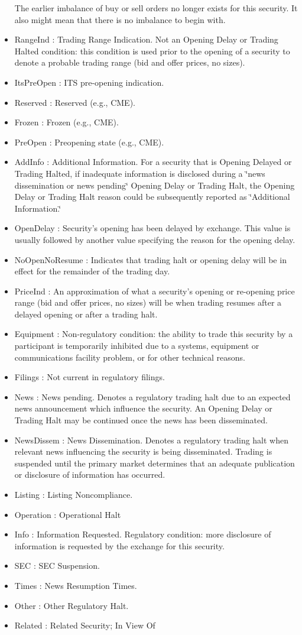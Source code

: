 \begin{itemize}
The earlier imbalance of buy or sell orders no longer exists for this security. It also might mean that there is no imbalance to begin with. \item Range\-Ind : Trading Range Indication. Not an Opening Delay or Trading Halted condition: this condition is used prior to the opening of a security to denote a probable trading range (bid and offer prices, no sizes). \item Its\-Pre\-Open : ITS pre-opening indication. \item Reserved : Reserved (e.g., CME). \item Frozen : Frozen (e.g., CME). \item Pre\-Open : Preopening state (e.g., CME). \item Add\-Info : Additional Information. For a security that is Opening Delayed or Trading Halted, if inadequate information is disclosed during a \char`\"{}news dissemination or news pending\char`\"{} Opening Delay or Trading Halt, the Opening Delay or Trading Halt reason could be subsequently reported as \char`\"{}Additional Information.\char`\"{} \item Open\-Delay : Security's opening has been delayed by exchange. This value is usually followed by another value specifying the reason for the opening delay. \item No\-Open\-No\-Resume : Indicates that trading halt or opening delay will be in effect for the remainder of the trading day. \item Price\-Ind : An approximation of what a security's opening or re-opening price range (bid and offer prices, no sizes) will be when trading resumes after a delayed opening or after a trading halt. \item Equipment : Non-regulatory condition: the ability to trade this security by a participant is temporarily inhibited due to a systems, equipment or communications facility problem, or for other technical reasons. \item Filings : Not current in regulatory filings. \item News : News pending. Denotes a regulatory trading halt due to an expected news announcement which influence the security. An Opening Delay or Trading Halt may be continued once the news has been disseminated. \item News\-Dissem : News Dissemination. Denotes a regulatory trading halt when relevant news influencing the security is being disseminated. Trading is suspended until the primary market determines that an adequate publication or disclosure of information has occurred. \item Listing : Listing Noncompliance. \item Operation : Operational Halt \item Info : Information Requested. Regulatory condition: more disclosure of information is requested by the exchange for this security. \item SEC : SEC Suspension. \item Times : News Resumption Times. \item Other : Other Regulatory Halt. \item Related : Related Security; In View Of 
\end{itemize}
